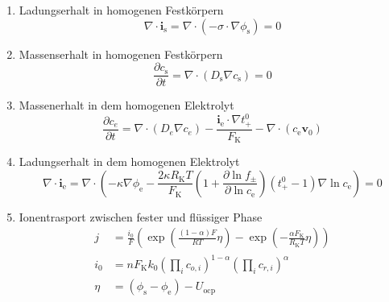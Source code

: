 \begin{enumerate}
    \item Ladungserhalt in homogenen Festkörpern
    \begin{equation}
        \nabla \cdot \boldsymbol{i}_{\text{s}} = \nabla \cdot \left( - \sigma \cdot \nabla \phi_{\text{s}} \right) = 0
    \end{equation}

    \item Massenserhalt in homogenen Festkörpern
    \begin{equation}
        \frac{\partial c_{\text{s}}}{\partial t}  = \nabla \cdot \left( D_{\text{s}} \nabla c_{\text{s}} \right) = 0
    \end{equation}

    \item Massenerhalt in dem homogenen Elektrolyt
    \begin{equation}
        \frac{\partial c_e}{\partial t} = \nabla \cdot \left( D_e   \nabla c_e \right) - \frac{\boldsymbol{i}_{\text{e}} \cdot    \nabla t_+^0}{F_{\text{K}}} - \nabla \cdot \left( c_{\text{e}} \boldsymbol{v}_0\right)
    \end{equation}

    \item Ladungserhalt  in dem homogenen Elektrolyt
    \begin{equation}
        \nabla \cdot \boldsymbol{i}_{\text{e}} = \nabla \cdot \left(    - \kappa \nabla \phi_{\text{e}}  -\frac{2\kappa R_{\text{K}} T}{F_{\text{K}}} \left(  1+ \frac{\partial \ln f_\pm}{\partial \ln c_{\text{e}}}\right)   \left( t_+^0-1\right) \nabla \ln c_{\text{e}} \right) = 0
    \end{equation}

    \item Ionentrasport zwischen fester und flüssiger Phase
    \begin{align}
        j &= \frac{i_0}{F}\left( \exp \left(\frac{\left(1-\alpha\right)  F}{RT}\eta \right) - \exp \left(-\frac{\alpha F_{\text{K}}}{R_{\text{K}} T}  \eta\right) \right)\\
        i_0 &= n F_{\text{K}} k_0 \left(\prod_i c_{o,i}\right)^{1-\alpha} \left( \prod_i c_{r,i}\right)^\alpha\\
        \eta &= (\phi_{\text{s}}-\phi_{\text{e}}) - U_{\text{ocp}}
    \end{align}
\end{enumerate}
